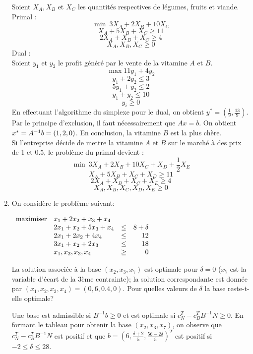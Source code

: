 \begin{enumerate}
    \begin{solution}
      Soient $X_{A}, X_{B}$ et $X_{C}$ les quantités respectives de légumes, fruits et viande. \\
      Primal : \\
      $$ \min ~3X_{A} + 2X_{B} + 10X_{C}$$
      $$X_{A} + 5X_{B} + X_{C} \geq 11$$
      $$2X_{A} + X_{B} + X_{C} \geq 4$$
      $$ X_{A}, X_{B}, X_{C} \geq 0$$
      Dual : \\
      Soient $y_{1}$ et $y_{2}$ le profit généré par le vente de la vitamine $A$ et $B$.
      $$ \max 11y_{1} + 4y_{2}$$
      $$ y_{1} + 2y_{2} \le 3$$
      $$ 5y_{1} + y_{2}  \le 2$$
      $$ y_{1} + y_{2} \le 10$$
      $$y_{i} \geq 0$$
      En effectuant l'algorithme du simplexe pour le dual, on obtient $y^{*} = (\frac{1}{9},\frac{13}{9})$. Par le principe d'exclusion, il faut nécessairement que $Ax = b$. On obtient $x^* = A^{-1}b = (1,2,0)$. En conclusion, la vitamine $B$ est la plus chère. \\
      Si l'entreprise décide de mettre la vitamine $A$ et $B$ sur le marché à des prix de 1 et 0.5, le problème du primal devient : \\
      $$ \min ~3X_{A} + 2X_{B} + 10X_{C} + X_{D} + \frac{1}{2}X_{E}$$
      $$X_{A} + 5X_{B} + X_{C} + X_{D} \geq 11$$
      $$2X_{A} + X_{B} + X_{C} + X_{E} \geq 4$$
      $$ X_{A}, X_{B}, X_{C}, X_{D}, X_{E} \geq 0$$
    \end{solution}

  \item On considère le problème suivant:

    $
    \begin{array}{llcr}
      \mbox{maximiser} & x_1+2x_2+ x_3+x_4\\
      & 2x_1+x_2+5x_3+x_4 & \leq & 8 + \delta\\
      & 2x_1+ 2x_2+ 4x_4 & \leq & 12\\
      & 3x_1+ x_2+ 2x_3 & \leq & 18\\
      & x_1, x_2, x_3, x_4 & \geq & 0
    \end{array}
    $

    La solution associée à la base $(x_2, x_3, x_7)$ est optimale pour $\delta = 0$ ($x_7$ est la variable d'écart de la 3ème contrainte); la solution
    correspondante est donnée par $(x_1, x_2, x_3, x_4)=(0, 6, 0.4, 0)$. Pour quelles valeurs de
    $\delta$ la base reste-t-elle optimale?



    \begin{solution}
      Une base est admissible si $B^{-1}b \geq 0$ et est optimale si $c_{N}^{T} - c_{B}^{T}B^{-1}N \geq0 $. En formant le tableau pour obtenir la base $(x_{2},x_{3},x_{7})$, on observe que $c_{N}^{T} - c_{B}^{T}B^{-1}N$ est positif et que $b = (6, \frac{\delta +2}{5}, \frac{56 - 2\delta}{5})^{T}$ est positif si $ -2 \le \delta \le 28$.
    \end{solution}


\end{enumerate}

